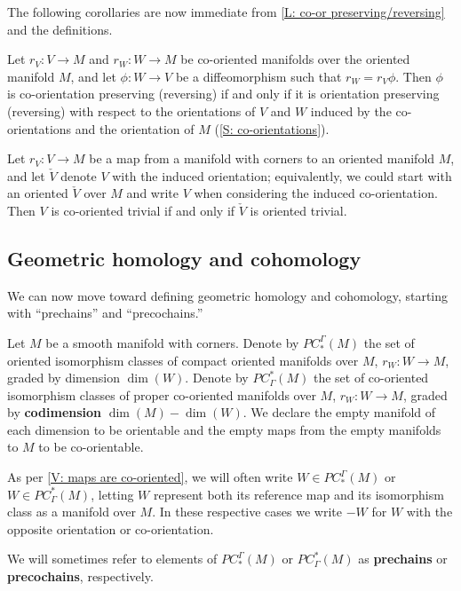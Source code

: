 The following corollaries are now immediate from \cref{L: co-or preserving/reversing} and the definitions.

\begin{corollary}\label{C: co-or preserving is or preserving}
	Let $r_V \colon V \to M$ and $r_W \colon W \to M$ be co-oriented manifolds over the oriented manifold $M$, and let $\phi \colon W \to V$ be a diffeomorphism such that $r_W = r_V \phi$.
	Then $\phi$ is co-orientation preserving (reversing) if and only if it is orientation preserving (reversing) with respect to the orientations of $V$ and $W$ induced by the co-orientations and the orientation of $M$ (\cref{S: co-orientations}).
\end{corollary}

\begin{corollary}\label{C: induced triviality}
	Let $r_V \colon V \to M$ be a map from a manifold with corners to an oriented manifold $M$, and let $\check V$ denote $V$ with the induced orientation; equivalently, we could start with an oriented $\check V$ over $M$ and write $V$ when considering the induced co-orientation.
	Then $V$ is co-oriented trivial if and only if $\check V$ is oriented trivial.
\end{corollary}

\subsection{Geometric homology and cohomology}

We can now move toward defining geometric homology and cohomology, starting with ``prechains'' and ``precochains.''

\begin{definition}\label{D: PC}
	Let $M$ be a smooth manifold with corners.
	Denote by $PC^\Gamma_*(M)$ the set of oriented isomorphism classes of compact oriented manifolds over $M$, $r_W \colon W \to M$,
	graded by dimension $\dim(W)$.
	Denote by $PC_\Gamma^*(M)$ the set of co-oriented isomorphism classes of proper co-oriented manifolds over $M$, $r_W \colon W \to M$,
	graded by \textbf{codimension} $\dim(M) - \dim(W)$.
	We declare the empty manifold of each dimension to be orientable and the empty maps from the empty manifolds to $M$ to be co-orientable.

	As per \cref{V: maps are co-oriented}, we will often write $W \in PC^\Gamma_*(M)$ or $W \in PC_\Gamma^*(M)$, letting $W$ represent both its reference map and its isomorphism class as a manifold over $M$.
	In these respective cases we write $-W$ for $W$ with the opposite orientation or co-orientation.

	We will sometimes refer to elements of $PC^\Gamma_*(M)$ or $PC_\Gamma^*(M)$ as \textbf{prechains} or \textbf{precochains}, respectively.
\end{definition}

